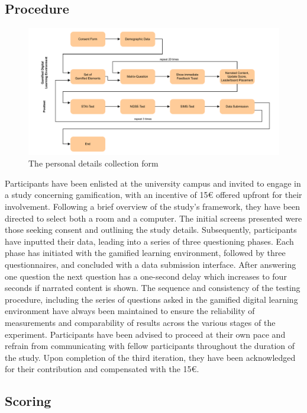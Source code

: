 \subsection{Procedure}
\begin{figure}[H]
  \centering
  \includegraphics{img/Procedure}
  \caption{The personal details collection form}
  \label{fig:figureDetails}
\end{figure}
Participants have been enlisted at the university campus and invited to engage in a study concerning gamification, with an incentive of 15€ offered upfront for their involvement.
Following a brief overview of the study's framework, they have been directed to select both a room and a computer.
The initial screens presented were those seeking consent and outlining the study details. Subsequently, participants have inputted their data, leading into a series of three questioning phases.
Each phase has initiated with the gamified learning environment, followed by three questionnaires, and concluded with a data submission interface.
After answering one question the next question has a one-second delay which increases to four seconds if narrated content is shown.
The sequence and consistency of the testing procedure, including the series of questions asked in the gamified digital learning environment have always been maintained to ensure the reliability of measurements and comparability of results across the various stages of the experiment.
Participants have been advised to proceed at their own pace and refrain from communicating with fellow participants throughout the duration of the study.
Upon completion of the third iteration, they have been acknowledged for their contribution and compensated with the 15€.

\subsection{Scoring}

